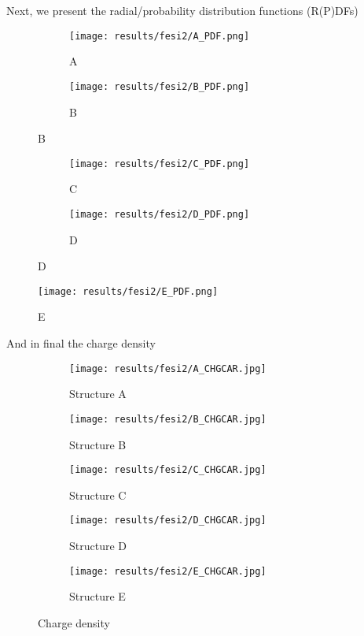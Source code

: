 Next, we present the radial/probability distribution functions (R(P)DFs)

\begin{figure}[H]
	\begin{subfigure}{\textwidth}
		\texttt{[image: results/fesi2/A\_PDF.png]}
		\caption{A}
	\end{subfigure}	
	\begin{subfigure}{\textwidth}
		\texttt{[image: results/fesi2/B\_PDF.png]}
		\caption{B}
	\end{subfigure}
\end{figure}
\begin{figure}[H]
	\begin{subfigure}{\textwidth}
		\texttt{[image: results/fesi2/C\_PDF.png]}
		\caption{C}
	\end{subfigure}
	\begin{subfigure}{\textwidth}
		\texttt{[image: results/fesi2/D\_PDF.png]}
		\caption{D}
	\end{subfigure}
\end{figure}
\begin{figure}[H]
		\texttt{[image: results/fesi2/E\_PDF.png]}
		\caption{E}
\end{figure}

And in final the charge density 

\begin{figure}
	\begin{subfigure}{0.5\textwidth}
		\texttt{[image: results/fesi2/A\_CHGCAR.jpg]}
		\caption{Structure A}
	\end{subfigure}
	\hfill
	\begin{subfigure}{0.5\textwidth}
		\texttt{[image: results/fesi2/B\_CHGCAR.jpg]}
		\caption{Structure B}
	\end{subfigure}
	\begin{subfigure}{0.5\textwidth}
		\texttt{[image: results/fesi2/C\_CHGCAR.jpg]}
		\caption{Structure C}
	\end{subfigure}
	\hfill
	\begin{subfigure}{0.5\textwidth}
		\texttt{[image: results/fesi2/D\_CHGCAR.jpg]}
		\caption{Structure D}
	\end{subfigure}
	\begin{subfigure}{0.5\textwidth}
		\texttt{[image: results/fesi2/E\_CHGCAR.jpg]}
		\caption{Structure E}
	\end{subfigure}
		\caption{Charge density}
		\label{chgcar}
\end{figure}


